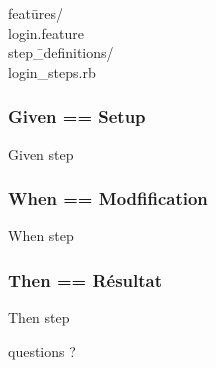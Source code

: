 \documentclass{beamer}
\begin{document}
\begin{frame}
  \begin{tabbing}
    feat\=ures/ \\
    \> login.feature \\
    \> step\=\_definitions/ \\
    \> \> login\_steps.rb \\
  \end{tabbing}
\end{frame}

\begin{frame}
  \frametitle{Given == Setup}
  \begin{beamerboxesrounded}{Given step}
    
  \end{beamerboxesrounded}
\end{frame}

\begin{frame}
  \frametitle{When == Modfification}
  \begin{beamerboxesrounded}{When step}
    
  \end{beamerboxesrounded}
\end{frame}

\begin{frame}
  \frametitle{Then == R\'esultat}
  \begin{beamerboxesrounded}{Then step}
    
  \end{beamerboxesrounded}
\end{frame}

\begin{frame}
    \begin{center}
    \huge{}
    questions ?
    \end{center}
\end{frame}
\end{document}
